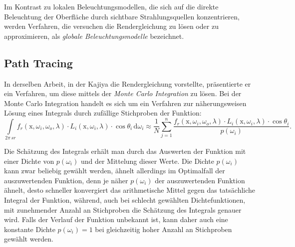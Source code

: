 \documentclass[thesis.tex]{subfiles}
\begin{document}
Im Kontrast zu lokalen Beleuchtungsmodellen, die sich auf die direkte Beleuchtung der Oberfläche durch sichtbare Strahlungsquellen konzentrieren, werden Verfahren, die versuchen die Rendergleichung zu lösen oder zu approximieren, als \emph{globale Beleuchtungsmodelle} bezeichnet.

\subsection{Path Tracing}\label{sec:path_tracing}

In derselben Arbeit, in der Kajiya die Rendergleichung vorstellte, präsentierte er ein Verfahren, um diese mittels der \emph{Monte Carlo Integration} zu lösen. Bei der Monte Carlo Integration handelt es sich um ein Verfahren zur näherungsweisen Lösung eines Integrals durch zufällige Stichproben der Funktion:
\begin{equation}
\int\limits_{2\pi\,sr} f_r(\mathrm{x}, \omega_i, \omega_o, \lambda) \cdot L_i(\mathrm{x}, \omega_i, \lambda) \cdot \cos\theta_i \, \mathrm{d}\omega_i \approx \frac{1}{N} \sum \limits_{j=1}^n  \frac{f_r(\mathrm{x}, \omega_i, \omega_o, \lambda) \cdot L_i(\mathrm{x}, \omega_i, \lambda) \cdot \cos\theta_i}{p({\omega_i})}.
\end{equation}

Die Schätzung des Integrals erhält man durch das Auswerten der Funktion mit einer Dichte von $p({\omega_i})$ und der Mittelung dieser Werte. Die Dichte $p({\omega_i})$ kann zwar beliebig gewählt werden, ähnelt allerdings im Optimalfall der auszuwertenden Funktion, denn je näher $p({\omega_i})$ der auszuwertenden Funktion ähnelt, desto schneller konvergiert das arithmetische Mittel gegen das tatsächliche Integral der Funktion, während, auch bei schlecht gewählten Dichtefunktionen, mit zunehmender Anzahl an Stichproben die Schätzung des Integrals genauer wird. Falls der Verlauf der Funktion unbekannt ist, kann daher auch eine konstante Dichte $p({\omega_i}) = 1$ bei gleichzeitig hoher Anzahl an Stichproben gewählt werden.
\end{document}
